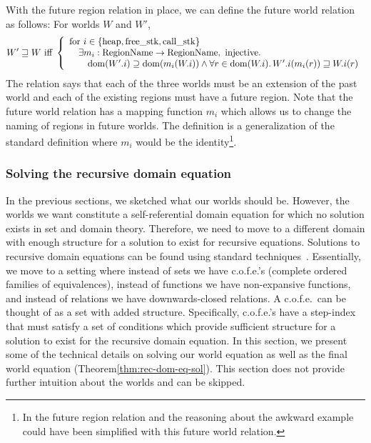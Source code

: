 \begin{jversion}
With the future region relation in place, we can define the future world relation as follows: For worlds $W$ and $W'$,
\[
  W' \future W \text{ iff } \left\{
    \array{l}
    \text{for $i \in \{\mathrm{heap},\mathrm{free\_stk},\mathrm{call\_stk} \}$} \\
    \quad\exists m_i : \RegionName \fun \RegionName, \text{ injective}\ldotp\\
    \qquad \dom(W'.i) \supseteq \dom(m_i(W.i)) \wedge \forall r \in \dom(W.i)\ldotp W'.i(m_i(r)) \future W.i(r)
     \endarray
  \right.
\]
The relation says that each of the three worlds must be an extension of the past world and each of the existing regions must have a future region.
Note that the future world relation has a mapping function $m_i$ which allows us to change the naming of regions in future worlds.
The definition is a generalization of the standard definition where $m_i$ would be the identity\footnote{In \citet{skorstengaard_reasoning_2017} the future region relation and the reasoning about the awkward example could have been simplified with this future world relation.}.

\subsubsection{Solving the recursive domain equation}
\label{subsubsec:rec-dom-eq}
In the previous sections, we sketched what our worlds should be.
However, the worlds we want constitute a self-referential domain equation for which no solution exists in set and domain theory.
Therefore, we need to move to a different domain with enough structure for a solution to exist for recursive equations.
Solutions to recursive domain equations can be found using standard techniques~\citep{scott_1976,america_1989,Birkedal:2011:SKM:1926385.1926401}.
Essentially, we move to a setting where instead of sets we have c.o.f.e.'s (complete ordered families of equivalences), instead of functions we have non-expansive functions, and instead of relations we have downwards-closed relations.
A c.o.f.e.\ can be thought of as a set with added structure.
Specifically, c.o.f.e.'s have a step-index that must satisfy a set of conditions which provide sufficient structure for a solution to exist for the recursive domain equation.
In this section, we present some of the technical details on solving our world equation as well as the final world equation (Theorem\ref{thm:rec-dom-eq-sol}).
This section does not provide further intuition about the worlds and can be skipped.


\end{jversion}
